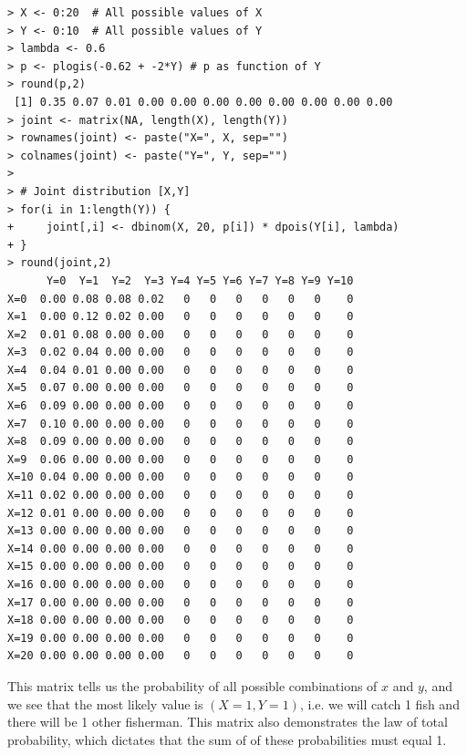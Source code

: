 \begin{small}
\begin{verbatim}
> X <- 0:20  # All possible values of X
> Y <- 0:10  # All possible values of Y
> lambda <- 0.6
> p <- plogis(-0.62 + -2*Y) # p as function of Y
> round(p,2)
 [1] 0.35 0.07 0.01 0.00 0.00 0.00 0.00 0.00 0.00 0.00 0.00
> joint <- matrix(NA, length(X), length(Y))
> rownames(joint) <- paste("X=", X, sep="")
> colnames(joint) <- paste("Y=", Y, sep="")
>
> # Joint distribution [X,Y]
> for(i in 1:length(Y)) {
+     joint[,i] <- dbinom(X, 20, p[i]) * dpois(Y[i], lambda)
+ }
> round(joint,2)
      Y=0  Y=1  Y=2  Y=3 Y=4 Y=5 Y=6 Y=7 Y=8 Y=9 Y=10
X=0  0.00 0.08 0.08 0.02   0   0   0   0   0   0    0
X=1  0.00 0.12 0.02 0.00   0   0   0   0   0   0    0
X=2  0.01 0.08 0.00 0.00   0   0   0   0   0   0    0
X=3  0.02 0.04 0.00 0.00   0   0   0   0   0   0    0
X=4  0.04 0.01 0.00 0.00   0   0   0   0   0   0    0
X=5  0.07 0.00 0.00 0.00   0   0   0   0   0   0    0
X=6  0.09 0.00 0.00 0.00   0   0   0   0   0   0    0
X=7  0.10 0.00 0.00 0.00   0   0   0   0   0   0    0
X=8  0.09 0.00 0.00 0.00   0   0   0   0   0   0    0
X=9  0.06 0.00 0.00 0.00   0   0   0   0   0   0    0
X=10 0.04 0.00 0.00 0.00   0   0   0   0   0   0    0
X=11 0.02 0.00 0.00 0.00   0   0   0   0   0   0    0
X=12 0.01 0.00 0.00 0.00   0   0   0   0   0   0    0
X=13 0.00 0.00 0.00 0.00   0   0   0   0   0   0    0
X=14 0.00 0.00 0.00 0.00   0   0   0   0   0   0    0
X=15 0.00 0.00 0.00 0.00   0   0   0   0   0   0    0
X=16 0.00 0.00 0.00 0.00   0   0   0   0   0   0    0
X=17 0.00 0.00 0.00 0.00   0   0   0   0   0   0    0
X=18 0.00 0.00 0.00 0.00   0   0   0   0   0   0    0
X=19 0.00 0.00 0.00 0.00   0   0   0   0   0   0    0
X=20 0.00 0.00 0.00 0.00   0   0   0   0   0   0    0
\end{verbatim}
\end{small}
This matrix tells us the probability of all possible combinations of
$x$ and $y$, and we see that the most likely value is $(X=1,Y=1)$,
i.e. we will catch 1 fish and there will be 1 other fisherman. This
matrix also demonstrates the law of total probability, which dictates
that the sum of of these probabilities must equal 1.

